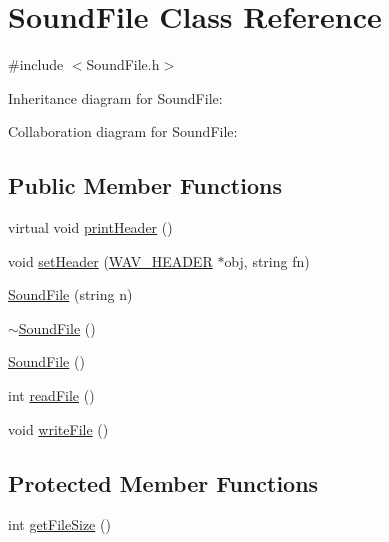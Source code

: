 \hypertarget{classSoundFile}{}\section{Sound\+File Class Reference}
\label{classSoundFile}


{\ttfamily \#include $<$Sound\+File.\+h$>$}



Inheritance diagram for Sound\+File\+:


Collaboration diagram for Sound\+File\+:
\subsection*{Public Member Functions}
\begin{DoxyCompactItemize}
\item 
virtual void \hyperlink{classSoundFile_a44b17fb295a9918410c7ec4242370ef9}{print\+Header} ()
\item 
void \hyperlink{classSoundFile_ab867a2098653a80f9eb89d39b4ad3f03}{set\+Header} (\hyperlink{structWAV__HEADER}{W\+A\+V\+\_\+\+H\+E\+A\+D\+ER} $\ast$obj, string fn)
\item 
\hyperlink{classSoundFile_ad51984b0112e70cae3158b17ab2e3466}{Sound\+File} (string n)
\item 
\hyperlink{classSoundFile_a2a4cc3a7780cc699e1ef51fc98f5d846}{$\sim$\+Sound\+File} ()
\item 
\hyperlink{classSoundFile_a6b4a3ffaf85f0f60b8c311185ea8bd58}{Sound\+File} ()
\item 
int \hyperlink{classSoundFile_a35eb7dfeadb241c8ab4477ff1370dd5b}{read\+File} ()
\item 
void \hyperlink{classSoundFile_aaaa496c20586d179906a301f0b4ab3a5}{write\+File} ()
\end{DoxyCompactItemize}
\subsection*{Protected Member Functions}
\begin{DoxyCompactItemize}
\item 
int \hyperlink{classSoundFile_a0455dae80379afda92f2900a74b4f44a}{get\+File\+Size} ()
\end{DoxyCompactItemize}

